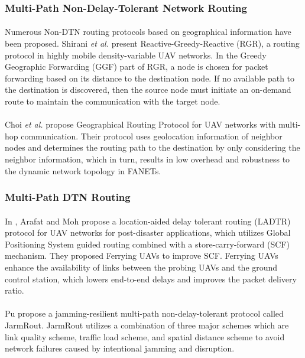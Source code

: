 \documentclass[a4paper,12pt]{report}
\begin{document}
\subsubsection{Multi-Path Non-Delay-Tolerant Network Routing}
\paragraph{}
Numerous Non-DTN routing protocols based on geographical information have been proposed. Shirani {\it et al.} \cite{shirani2012delay} present Reactive-Greedy-Reactive (RGR), a routing protocol in highly mobile density-variable UAV networks. In the Greedy Geographic Forwarding (GGF) part of RGR, a node is chosen for packet forwarding based on its distance to the destination node. If no available path to the destination is discovered, then the source node must initiate an on-demand route to maintain the communication with the target node.

\paragraph{}
Choi {\it et al.} \cite{8436724} propose Geographical Routing Protocol for UAV networks with multi-hop communication. Their protocol uses geolocation information of neighbor nodes and determines the routing path to the destination by only considering the neighbor information, which in turn, results in low overhead and robustness to the dynamic network topology in FANETs. 

\subsubsection{Multi-Path DTN Routing}
\paragraph{}
In \cite{8490824}, Arafat and Moh propose a location-aided delay tolerant routing (LADTR) protocol for UAV networks for post-disaster applications, which utilizes Global Positioning System guided routing combined with a store-carry-forward (SCF) mechanism. They proposed Ferrying UAVs to improve SCF.  Ferrying UAVs enhance the availability of links between the probing UAVs and the ground control station, which lowers end-to-end delays and improves the packet delivery ratio\cite{8490824}. 

\paragraph{}
Pu \cite{8523684} propose a jamming-resilient multi-path non-delay-tolerant protocol called JarmRout. JarmRout utilizes a combination of three major schemes which are link quality scheme, traffic load scheme, and spatial distance scheme to avoid network failures caused by intentional jamming and disruption.
\end{document}
